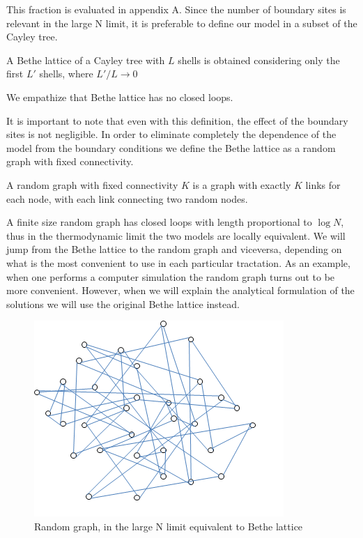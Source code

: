 This fraction is evaluated in appendix A.
Since the number of boundary sites is relevant in the large N limit, it is preferable to
define our model in a subset of the Cayley tree.

\begin{definition}

A Bethe lattice of a Cayley tree with $L$ shells
is obtained considering only the first
$L'$ shells, where $L'/L \rightarrow 0$

\end{definition}

We empathize that Bethe lattice has no closed loops.

It is important to note that even with this definition, the effect of the
boundary sites is not negligible. In order to eliminate completely the
dependence of the model from the boundary conditions we define the Bethe lattice
as a random graph with fixed connectivity.

\begin{definition}

A random graph with fixed connectivity $K$ is a graph with exactly $K$ links for each node, with each link connecting two random nodes.

\end{definition}

A finite size random graph has closed
loops with length proportional to $\log N$, thus in the thermodynamic limit
the two models are locally equivalent. We will jump from the Bethe lattice to the random graph and viceversa,
depending on what is the most convenient to use in each particular tractation. As an example, when one performs a computer simulation the random graph turns out to be more convenient. However, when we will explain the analytical formulation of the solutions we will use the original Bethe lattice instead.

\begin{figure}[h]
\centering
\includegraphics{img/randomgraph.png}
\caption{Random graph, in the large N limit equivalent to Bethe lattice}
\label{fig:}
\end{figure}
